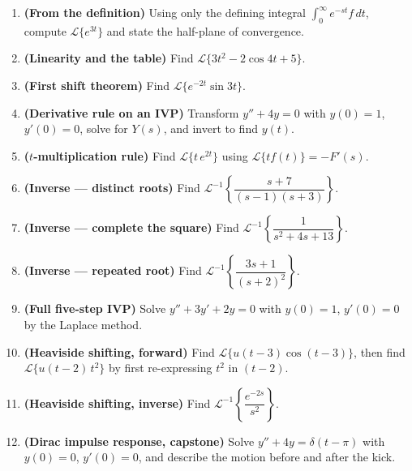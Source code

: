 \begin{enumerate}[leftmargin=2em]
    \item \textbf{(From the definition)} Using only the defining integral
          $\int_0^\infty e^{-st}f\,dt$, compute $\mathcal{L}\{e^{3t}\}$ and state the
          half-plane of convergence.

    \item \textbf{(Linearity and the table)} Find
          $\mathcal{L}\{3t^2 - 2\cos 4t + 5\}$.

    \item \textbf{(First shift theorem)} Find $\mathcal{L}\{e^{-2t}\sin 3t\}$.

    \item \textbf{(Derivative rule on an IVP)} Transform $y'' + 4y = 0$ with
          $y(0)=1$, $y'(0)=0$, solve for $Y(s)$, and invert to find $y(t)$.

    \item \textbf{($t$-multiplication rule)} Find $\mathcal{L}\{t\,e^{2t}\}$ using
          $\mathcal{L}\{t f(t)\} = -F'(s)$.

    \item \textbf{(Inverse --- distinct roots)} Find
          $\mathcal{L}^{-1}\!\left\{\dfrac{s+7}{(s-1)(s+3)}\right\}$.

    \item \textbf{(Inverse --- complete the square)} Find
          $\mathcal{L}^{-1}\!\left\{\dfrac{1}{s^2+4s+13}\right\}$.

    \item \textbf{(Inverse --- repeated root)} Find
          $\mathcal{L}^{-1}\!\left\{\dfrac{3s+1}{(s+2)^2}\right\}$.

    \item \textbf{(Full five-step IVP)} Solve $y'' + 3y' + 2y = 0$ with $y(0)=1$,
          $y'(0)=0$ by the Laplace method.

    \item \textbf{(Heaviside shifting, forward)} Find
          $\mathcal{L}\{u(t-3)\cos(t-3)\}$, then find
          $\mathcal{L}\{u(t-2)\,t^2\}$ by first re-expressing $t^2$ in $(t-2)$.

    \item \textbf{(Heaviside shifting, inverse)} Find
          $\mathcal{L}^{-1}\!\left\{\dfrac{e^{-2s}}{s^2}\right\}$.

    \item \textbf{(Dirac impulse response, capstone)} Solve $y'' + 4y = \delta(t-\pi)$
          with $y(0)=0$, $y'(0)=0$, and describe the motion before and after the kick.
\end{enumerate}

